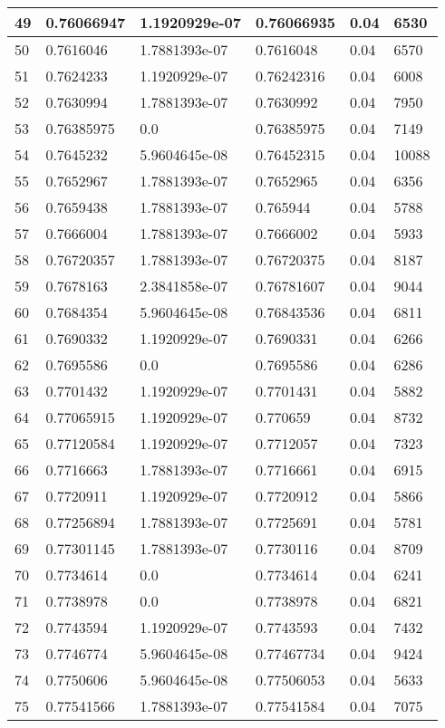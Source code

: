 \begin{longtable}{|l|l|l|l|l|l|}
49 & 0.76066947 & 1.1920929e-07 & 0.76066935 & 0.04 & 6530 \\ \hline 
50 & 0.7616046 & 1.7881393e-07 & 0.7616048 & 0.04 & 6570 \\ \hline 
51 & 0.7624233 & 1.1920929e-07 & 0.76242316 & 0.04 & 6008 \\ \hline 
52 & 0.7630994 & 1.7881393e-07 & 0.7630992 & 0.04 & 7950 \\ \hline 
53 & 0.76385975 & 0.0 & 0.76385975 & 0.04 & 7149 \\ \hline 
54 & 0.7645232 & 5.9604645e-08 & 0.76452315 & 0.04 & 10088 \\ \hline 
55 & 0.7652967 & 1.7881393e-07 & 0.7652965 & 0.04 & 6356 \\ \hline 
56 & 0.7659438 & 1.7881393e-07 & 0.765944 & 0.04 & 5788 \\ \hline 
57 & 0.7666004 & 1.7881393e-07 & 0.7666002 & 0.04 & 5933 \\ \hline 
58 & 0.76720357 & 1.7881393e-07 & 0.76720375 & 0.04 & 8187 \\ \hline 
59 & 0.7678163 & 2.3841858e-07 & 0.76781607 & 0.04 & 9044 \\ \hline 
60 & 0.7684354 & 5.9604645e-08 & 0.76843536 & 0.04 & 6811 \\ \hline 
61 & 0.7690332 & 1.1920929e-07 & 0.7690331 & 0.04 & 6266 \\ \hline 
62 & 0.7695586 & 0.0 & 0.7695586 & 0.04 & 6286 \\ \hline 
63 & 0.7701432 & 1.1920929e-07 & 0.7701431 & 0.04 & 5882 \\ \hline 
64 & 0.77065915 & 1.1920929e-07 & 0.770659 & 0.04 & 8732 \\ \hline 
65 & 0.77120584 & 1.1920929e-07 & 0.7712057 & 0.04 & 7323 \\ \hline 
66 & 0.7716663 & 1.7881393e-07 & 0.7716661 & 0.04 & 6915 \\ \hline 
67 & 0.7720911 & 1.1920929e-07 & 0.7720912 & 0.04 & 5866 \\ \hline 
68 & 0.77256894 & 1.7881393e-07 & 0.7725691 & 0.04 & 5781 \\ \hline 
69 & 0.77301145 & 1.7881393e-07 & 0.7730116 & 0.04 & 8709 \\ \hline 
70 & 0.7734614 & 0.0 & 0.7734614 & 0.04 & 6241 \\ \hline 
71 & 0.7738978 & 0.0 & 0.7738978 & 0.04 & 6821 \\ \hline 
72 & 0.7743594 & 1.1920929e-07 & 0.7743593 & 0.04 & 7432 \\ \hline 
73 & 0.7746774 & 5.9604645e-08 & 0.77467734 & 0.04 & 9424 \\ \hline 
74 & 0.7750606 & 5.9604645e-08 & 0.77506053 & 0.04 & 5633 \\ \hline 
75 & 0.77541566 & 1.7881393e-07 & 0.77541584 & 0.04 & 7075 \\ \hline 
\end{longtable}